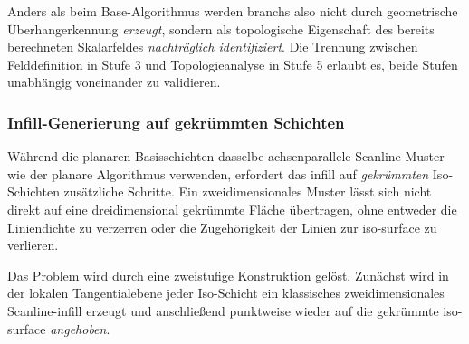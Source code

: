                 Anders als beim Base-Algorithmus werden \glspl{branch} also nicht durch geometrische Überhangerkennung \emph{erzeugt}, sondern als topologische Eigenschaft des bereits berechneten Skalarfeldes \emph{nachträglich identifiziert}.
                Die Trennung zwischen Felddefinition in Stufe 3 und Topologieanalyse in Stufe 5 erlaubt es, beide Stufen unabhängig voneinander zu validieren.

            \subsubsection{Infill-Generierung auf gekrümmten Schichten}\label{subsubsec:concept-crystal-infill} 
                Während die planaren Basisschichten dasselbe achsenparallele Scanline-Muster wie der planare Algorithmus verwenden, erfordert das \gls{infill} auf \emph{gekrümmten} Iso-Schichten zusätzliche Schritte.
                Ein zweidimensionales Muster lässt sich nicht direkt auf eine dreidimensional gekrümmte Fläche übertragen, ohne entweder die Liniendichte zu verzerren oder die Zugehörigkeit der Linien zur \gls{iso-surface} zu verlieren.

                Das Problem wird durch eine zweistufige Konstruktion gelöst.
                Zunächst wird in der lokalen Tangentialebene jeder Iso-Schicht ein klassisches zweidimensionales Scanline-\gls{infill} erzeugt und anschließend punktweise wieder auf die gekrümmte \gls{iso-surface} \emph{angehoben}.

